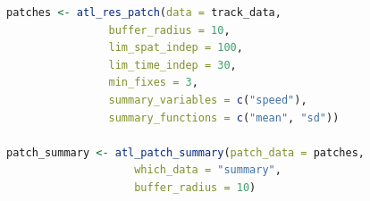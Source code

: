 \documentclass[10pt,paper=a4,headings=standardclasses
]{scrartcl}
\begin{document}
\begin{lstlisting}[float, language=R, style=customR, caption ={The \texttt{atl\_res\_patch} function can be used to classify a track into residence patches. The arguments \texttt{buffer\_radius} and \texttt{lim\_spat\_indep} are specified in metres, while the \texttt{lim\_time\_indep} is provided in minutes. In this example, specifying \texttt{summary\_variables = c("speed")}, and \texttt{summary\_functions = c("mean", "sd")} will provide the mean and standard deviation of instantaneous speed in each residence patch. The \texttt{atl\_patch\_summary} function is used to access the classified patch in one of three ways, here using the \texttt{summary} option which returns a table of patch-wise summary statistics.}]
patches <- atl_res_patch(data = track_data,
                buffer_radius = 10,
                lim_spat_indep = 100,
                lim_time_indep = 30,
                min_fixes = 3,
                summary_variables = c("speed"),
                summary_functions = c("mean", "sd"))
              
patch_summary <- atl_patch_summary(patch_data = patches,
                    which_data = "summary",
                    buffer_radius = 10)
\end{lstlisting}
\end{document}

